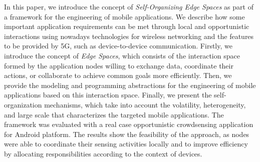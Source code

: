 In this paper, we introduce the concept of \textit{Self-Organizing Edge Spaces} as part of a framework for the engineering of mobile applications. We describe how some important application requirements can be met through local and opportunistic interactions using nowadays technologies for wireless networking and the features to be provided by 5G, such as device-to-device communication. Firstly, we introduce the concept of \textit{Edge Spaces}, which consists of the interaction space formed by the application nodes willing to exchange data, coordinate their actions, or collaborate to achieve common goals more efficiently. Then, we provide the modeling and programming abstractions for the engineering of mobile applications based on this interaction space. Finally, we present the self-organization mechanisms, which take into account the volatility, heterogeneity, and large scale that characterizes the targeted mobile applications. The framework was evaluated with a real case opportunistic crowdsensing application for Android platform. The results show the feasibility of the approach, as nodes were able to coordinate their sensing activities locally and to improve efficiency by allocating responsibilities according to the context of devices.









